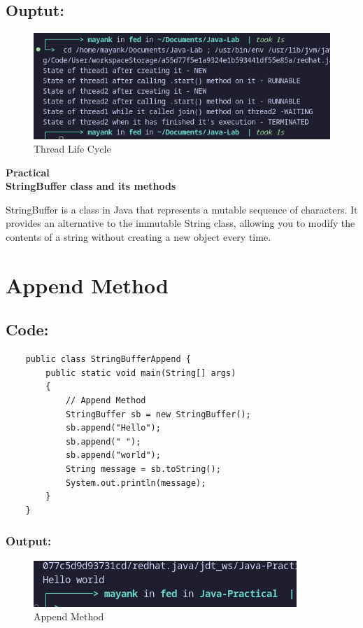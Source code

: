 \documentclass[a4paper,12pt]{article}
\newcounter{practicalno} %
\newcommand{\practicaltitle}[1]{
    \stepcounter{practicalno} %
    \newpage
    \begin{center}
        \vspace{1cm}
        \Large\textbf{Practical \thepracticalno} \\
        \vspace{0.5cm}
        \Large\textbf{#1} %
        \normalsize\vspace{1cm}
    \end{center}
}
\begin{document}
\subsection{Ouptut: }
\begin{figure}[H]
    \centering
    \includegraphics[width=0.8\linewidth]{images/Life.png}
    \caption{Thread Life Cycle}
\end{figure}

\setcounter{section}{0}
\practicaltitle{StringBuffer class and its methods}
StringBuffer is a class in Java that represents a mutable sequence of characters. It provides an alternative to the immutable String class, allowing you to modify the contents of a string without creating a new object every time.

\section{Append Method}

\subsection{Code:}
\begin{lstlisting}
    public class StringBufferAppend {
        public static void main(String[] args)
        {
            // Append Method
            StringBuffer sb = new StringBuffer();
            sb.append("Hello");
            sb.append(" ");
            sb.append("world");
            String message = sb.toString();
            System.out.println(message);
        }
    }    
\end{lstlisting}

\subsubsection{Output:}
\begin{figure}[H]
    \centering
    \includegraphics[width=0.8\linewidth]{images/41.png}
    \caption{Append Method}
\end{figure}
\end{document}
